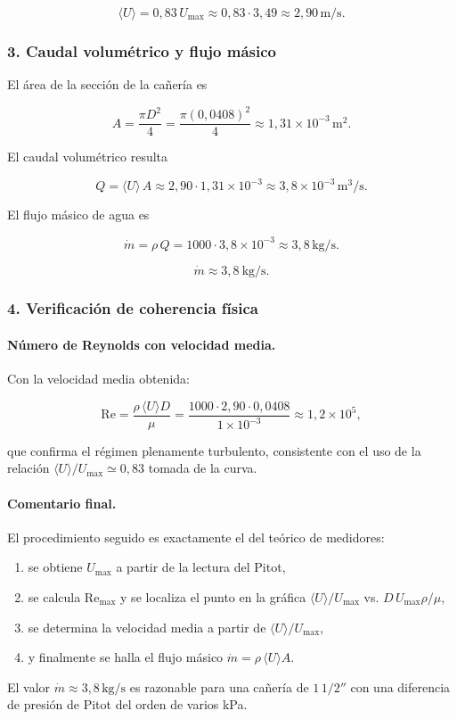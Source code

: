 \documentclass[12pt, a4paper]{article}
\begin{document}
\[
\langle U\rangle = 0{,}83\,U_{\max}
\approx 0{,}83\cdot 3{,}49
\approx 2{,}90\,\text{m/s}.
\]

\subsubsection*{3. Caudal volumétrico y flujo másico}

El área de la sección de la cañería es

\[
A = \frac{\pi D^2}{4}
  = \frac{\pi (0{,}0408)^2}{4}
  \approx 1{,}31\times 10^{-3}\,\text{m}^2.
\]

El caudal volumétrico resulta

\[
Q = \langle U\rangle\,A
  \approx 2{,}90\cdot 1{,}31\times 10^{-3}
  \approx 3{,}8\times 10^{-3}\,\text{m}^3/\text{s}.
\]

El flujo másico de agua es

\[
\dot m = \rho\,Q
       = 1000\cdot 3{,}8\times 10^{-3}
       \approx 3{,}8\,\text{kg/s}.
\]

\[
\boxed{\dot m \approx 3{,}8\ \text{kg/s}.}
\]

\subsubsection*{4. Verificación de coherencia física}

\paragraph{Número de Reynolds con velocidad media.}

Con la velocidad media obtenida:

\[
\mathrm{Re} = \frac{\rho\,\langle U\rangle D}{\mu}
            = \frac{1000\cdot 2{,}90\cdot 0{,}0408}{1\times 10^{-3}}
            \approx 1{,}2\times 10^5,
\]

que confirma el régimen plenamente turbulento, consistente con el uso
de la relación $\langle U\rangle/U_{\max}\simeq 0{,}83$ tomada de la curva.

\paragraph{Comentario final.}

El procedimiento seguido es exactamente el del teórico de medidores:
\begin{enumerate}
  \item se obtiene $U_{\max}$ a partir de la lectura del Pitot,
  \item se calcula $\mathrm{Re}_{\max}$ y se localiza el punto en la gráfica
        $\langle U\rangle/U_{\max}$ vs. $D\,U_{\max}\rho/\mu$,
  \item se determina la velocidad media a partir de 
        $\langle U\rangle/U_{\max}$,
  \item y finalmente se halla el flujo másico 
        $\dot m = \rho\,\langle U\rangle A$.
\end{enumerate}
El valor $\dot m \approx 3{,}8\,\text{kg/s}$ es razonable para una cañería
de $1{\,}1/2''$ con una diferencia de presión de Pitot del orden de varios kPa.
\end{document}
